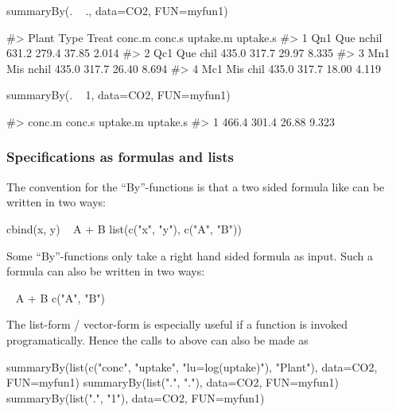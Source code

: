 \begin{Schunk}
\begin{Sinput}
summaryBy(. ~ ., data=CO2, FUN=myfun1)
\end{Sinput}
\begin{Soutput}
#>   Plant Type Treat conc.m conc.s uptake.m uptake.s
#> 1   Qn1  Que nchil  631.2  279.4    37.85    2.014
#> 2   Qc1  Que  chil  435.0  317.7    29.97    8.335
#> 3   Mn1  Mis nchil  435.0  317.7    26.40    8.694
#> 4   Mc1  Mis  chil  435.0  317.7    18.00    4.119
\end{Soutput}
\begin{Sinput}
summaryBy(. ~ 1, data=CO2, FUN=myfun1)
\end{Sinput}
\begin{Soutput}
#>   conc.m conc.s uptake.m uptake.s
#> 1  466.4  301.4    26.88    9.323
\end{Soutput}
\end{Schunk}

\hypertarget{specifications-as-formulas-and-lists}{%
\subsubsection{Specifications as formulas and
lists}\label{specifications-as-formulas-and-lists}}

The convention for the ``By''-functions is that a two sided formula like
can be written in two ways:

\begin{Schunk}
\begin{Sinput}
cbind(x, y) ~ A + B
list(c("x", "y"), c("A", "B"))
\end{Sinput}
\end{Schunk}

Some ``By''-functions only take a right hand sided formula as input.
Such a formula can also be written in two ways:

\begin{Schunk}
\begin{Sinput}
~ A + B
c("A", "B")
\end{Sinput}
\end{Schunk}

The list-form / vector-form is especially useful if a function is
invoked programatically. Hence the calls to  above can
also be made as

\begin{Schunk}
\begin{Sinput}
summaryBy(list(c("conc", "uptake", "lu=log(uptake)"), "Plant"), data=CO2, FUN=myfun1)
summaryBy(list(".", "."), data=CO2, FUN=myfun1)
summaryBy(list(".", "1"), data=CO2, FUN=myfun1)
\end{Sinput}
\end{Schunk}

